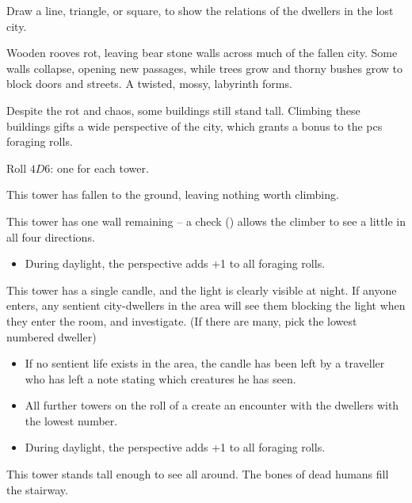 \begin{multicols}{2}
Draw a line, triangle, or square, to show the relations of the dwellers in the lost city.

\cityRelations

\label{lostTowers}

Wooden rooves rot, leaving bear stone walls across much of the fallen city.
Some walls collapse, opening new passages, while trees grow and thorny bushes grow to block doors and streets.
A twisted, mossy, labyrinth forms.

Despite the rot and chaos, some buildings still stand tall.
Climbing these buildings gifts a wide perspective of the city, which grants a bonus to the \glspl{pc} foraging rolls.

Roll $4D6$: one for each tower.

\begin{dlist}
  \item
  This tower has fallen to the ground, leaving nothing worth climbing.
  \item
  This tower has one wall remaining -- a  check (\tn[8]) allows the climber to see a little in all four directions.
  \begin{itemize}
    \item
    During daylight, the perspective adds +1 to all foraging rolls.
  \end{itemize}
  \item
  This tower has a single candle, and the light is clearly visible at night.
  If anyone enters, any sentient city-dwellers in the area will see them blocking the light when they enter the room, and investigate.
  (If there are many, pick the lowest numbered dweller)
  \begin{itemize}
    \item
    If no sentient life exists in the area, the candle has been left by a traveller who has left a note stating which creatures he has seen.
    \item
    All further towers on the roll of a  create an encounter with the dwellers with the lowest number.
    \item
    During daylight, the perspective adds +1 to all foraging rolls.
  \end{itemize}
  \item
  This tower stands tall enough to see all around.
  The bones of dead humans fill the stairway.


\end{dlist}
\end{multicols}
